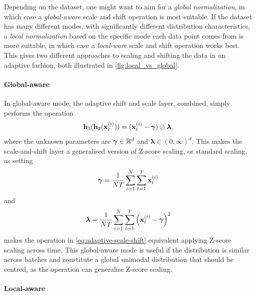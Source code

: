 \documentclass{statsmsc}
\begin{document}
{Depending on the dataset, one might want to aim for a \textit{global
normalization}, in which case a \textit{global-aware} scale and shift operation is most
suitable. If the dataset has many different modes, with significantly different distribution characteristics, a \textit{local normalization} based on the specific mode each data point comes from is more suitable, in which case a \textit{local-ware} scale and shift
operation works best. This gives two different approaches to scaling and
shifting the data in an adaptive fashion, both illustrated in \cref{fig:local_vs_global}.

\paragraph{Global-aware}%
\label{par:Global-aware}

In global-aware mode, the adaptive shift and scale layer, combined, simply performs the operation
\begin{equation}\label{eq:adaptive-scale-shift}
    \mathbf{h}_3(\mathbf{h}_2(\mathbf{x}_t^{(i)}))=(\mathbf{x}_t^{(i)} - \bm\gamma) \oslash \bm\lambda,
\end{equation}
where the unknown parameters are $\bm\gamma \in \mathbb{R}^d$ and $\bm\lambda \in (0,\infty)^d$.
This makes the scale-and-shift layer a generalised version of
Z-score scaling, or standard scaling, as setting
\begin{equation}
    \bm\gamma=\frac{1}{N T}  \sum^{N}_{i=1} \sum^{T}_{t=1} \mathbf{x}_{t}^{(i)}
\end{equation}
and
\begin{equation}
    \bm\lambda=\frac{1}{N T} \sum^{N}_{i=1} \sum^{T}_{t=1} \left(\mathbf{x}_{t}^{(i)}- \bm\gamma\right)^2
\end{equation}
makes the operation in \cref{eq:adaptive-scale-shift} equivalent applying Z-score scaling
across time.
This global-aware mode is useful if the distribution is similar across batches
and constitute a global unimodal distribution that should be centred, as the operation can generalise Z-score scaling.

\paragraph{Local-aware}%
\label{par:Local-aware}

}
\end{document}
